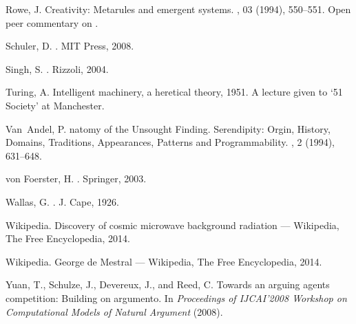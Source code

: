 \documentclass{llncs}
\begin{document}
\begin{thebibliography}{10}
{\sc Rowe, J.}
\newblock Creativity: {M}etarules and emergent systems.
, 03 (1994), 550--551.
\newblock Open peer commentary on \cite{boden}.

{\sc Schuler, D.}
.
\newblock MIT Press, 2008.

{\sc Singh, S.}
.
\newblock Rizzoli, 2004.

{\sc Turing, A.}
\newblock Intelligent machinery, a heretical theory, 1951.
\newblock A lecture given to {`}51 Society{'} at Manchester.

{\sc Van~Andel, P.}
natomy of the {U}nsought {F}inding. {S}erendipity: {O}rgin,
  {H}istory, {D}omains, {T}raditions, {A}ppearances, {P}atterns and
  {P}rogrammability.
, 2 (1994),
  631--648.

{\sc von Foerster, H.}
.
\newblock Springer, 2003.

{\sc Wallas, G.}
.
\newblock J. Cape, 1926.

{\sc Wikipedia}.
\newblock Discovery of cosmic microwave background radiation --- {W}ikipedia{,}
  {T}he {F}ree {E}ncyclopedia, 2014.

{\sc Wikipedia}.
\newblock George de {M}estral --- {W}ikipedia{,} {T}he {F}ree {E}ncyclopedia,
  2014.

{\sc Yuan, T., Schulze, J., Devereux, J., and Reed, C.}
\newblock Towards an arguing agents competition: Building on argumento.
\newblock In {\em Proceedings of IJCAI'2008 Workshop on Computational Models of
  Natural Argument\/} (2008).

\end{thebibliography}
\end{document}
